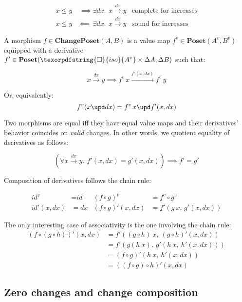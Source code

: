 \documentclass[]{rntz}
\newcommand\cat\textbf
\newcommand\CP{\cat{ChangePoset}}
\newcommand\Poset{\cat{Poset}}
\newcommand\D\Delta
\newcommand\x\times
\newcommand\iso{\texorpdfstring{\ensuremath{\square}}{iso}}
\newcommand\isof[1]{\iso {#1}}
\newcommand\fname[1]{\textit{#1}}
\newcommand\id{\fname{id}}
\newcommand\vals[1]{#1^v} %
\newcommand\chgs[1]{\D{#1}}
\newcommand\funct[1]{\vals{#1}}
\newcommand\deriv[1]{#1'}
\newcommand\bindsp{~\,}
\newcommand\fa[1]{\forall #1.\bindsp}
\newcommand\ex[1]{\exists #1.\bindsp}
\newcommand\validarrow\to
\newcommand\vld[3]{{#2 \mathrel{\overset{#1}{\validarrow}} #3}}
\newcommand\longvld[3]{{#2 \xrightarrow{#1} #3}}
\begin{document}
\begin{align*}
  x \le y &~\implies \ex{dx} \vld{dx} x y
  & \text{complete for increases}\\
  x \le y &\impliedby~ \ex{dx} \vld{dx} x y
  & \text{sound for increases}
\end{align*}

\noindent
A morphism $f \in \CP(A, B)$ is a value map $\funct f \in \Poset(\vals A, \vals
B)$ eq\-uip\-ped with a derivative $\deriv f \in \Poset(\isof{\vals A} \x \chgs
A, \chgs B)$ such that:

\[ \vld{dx} x y \implies \longvld{\deriv f(x,dx)}{\funct f\,x}{\funct f\,y}\]

\noindent Or, equivalently:
\[ \funct f(x \upd dx) = \funct f\,x \upd \deriv f(x, dx) \]

\noindent
Two morphisms are equal iff they have equal value maps and their derivatives'
behavior coincides on \emph{valid} changes. In other words, we quotient equality
of derivatives as follows:

\[ (\fa{\vld{dx} x y} \deriv f(x,dx) = \deriv g(x,dx))
\implies \deriv f = \deriv g \]

\noindent
Composition of derivatives follows the chain rule:

\begin{align*}
  \funct\id &= \id & \funct{(f \circ g)} &= \funct f \circ \funct g\\
  \deriv\id(x,dx) &= dx
  & \deriv{(f \circ g)} (x,dx) &= \deriv f (g ~x,\, \deriv g(x,dx))
\end{align*}

\noindent The only interesting case of associativity is the one involving the
chain rule:
\begin{align*}
  \deriv{(f \circ (g \circ h))} (x,dx)
  &= \deriv f((g \circ h) ~x,\ \deriv{(g \circ h)}(x,dx))\\
  &= \deriv f (g(h ~x),\ \deriv g(h ~x,\ \deriv h(x,dx)))\\
  &= \deriv{(f \circ g)} (h ~x,\ \deriv h(x,dx))\\
  &= \deriv{((f \circ g) \circ h)} (x,dx)
\end{align*}


\subsection{Zero changes and change composition}
\end{document}
